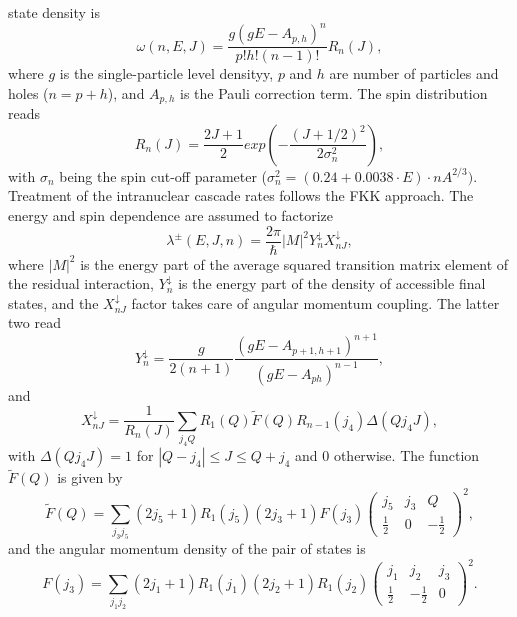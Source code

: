 \documentclass[twocolumn,amsmath,amssymb,10pt,groupedaddress,a4paper]{revtex4}
\begin{document}
state density is
\begin{equation}
\omega(n,E,J)=\frac{g(gE-A_{p,h})^{n}}{p!h!(n-1)!}R_{n}(J),
\end{equation}
\noindent where $g$ is the single-particle level densityy,
$p$ and $h$ are number of particles and holes ($n=p+h$), and $A_{p,h}$
is the Pauli correction term. The spin distribution reads
\begin{equation}
R_{n}(J)=\frac{2J+1}{2}exp\left(-\frac{(J+1/2)^{2}}{2\sigma_{n}^{2}}\right),
\end{equation}
 with $\sigma_{n}$ being the spin cut-off parameter ($\sigma_{n}^{2}=(0.24+0.0038\cdot E)\cdot nA^{2/3}).$
Treatment of the intranuclear cascade rates follows the FKK \cite{FKK}
approach. The energy and spin dependence are assumed to factorize
\begin{equation}
\lambda^{\pm}(E,J,n)=\frac{2\pi}{\hbar}|M|^{2}Y_{n}^{\downarrow}X_{nJ}^{\downarrow},
\end{equation}
\noindent where $|M|^{2}$ is the energy part of the average squared transition
matrix element of the residual interaction, $Y_{n}^{\downarrow}$
is the energy part of the density of accessible final states,  and
the $X_{nJ}^{\downarrow}$ factor takes care of angular momentum coupling.
The latter two read
\begin{equation}
Y_{n}^{\downarrow}=\frac{g}{2(n+1)}\frac{(gE-A_{p+1,h+1})^{n+1}}{(gE-A_{ph})^{n-1}},
\end{equation}
 and
\begin{equation}
X_{nJ}^{\downarrow}=\frac{1}{R_{n}(J)}\sum_{j_{4}Q}R_{1}(Q)\widetilde{F}(Q)R_{n-1}(j_{4})\Delta(Qj_{4}J),
\end{equation}
 with $\Delta(Qj_{4}J)=1$ for $|Q-j_{4}|\leq J\leq Q+j_{4}$ and
0 otherwise. The function $\widetilde{F}(Q)$ is given by
\begin{equation}
\widetilde{F}(Q)=\sum_{j_{3}j_{5}}(2j_{5}+1)R_{1}(j_{5})(2j_{3}+1)F(j_{3})\left(\begin{array}{ccc}
j_{5} & j_{3} & Q\\
\frac{1}{2} & 0 & -\frac{1}{2}\end{array}\right)^{2},
\end{equation}
 and the angular momentum density of the pair of states is
\begin{equation}
F(j_{3})=\sum_{j_{1}j_{2}}(2j_{1}+1)R_{1}(j_{1})(2j_{2}+1)R_{1}(j_{2})\left(\begin{array}{ccc}
j_{1} & j_{2} & j_{3}\\
\frac{1}{2} & -\frac{1}{2} & 0\end{array}\right)^{2}.
\end{equation}
\end{document}
